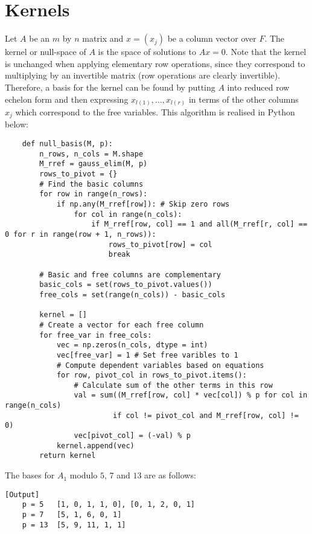 \documentclass{article}
\begin{document}
\section{Kernels}

Let \(A\) be an \(m\) by \(n\) matrix and \(x = (x_j)\) be a column vector over \(F\). The kernel or null-space of \(A\) is the space of solutions to \(Ax = 0\). Note that the kernel is unchanged when applying elementary row operations, since they correspond to multiplying by an invertible matrix (row operations are clearly invertible). Therefore, a basis for the kernel can be found by putting \(A\) into reduced row echelon form and then expressing \(x_{l(1)}, \dots, x_{l(r)}\) in terms of the other columns \(x_j\) which correspond to the free variables. This algorithm is realised in Python below:

\begin{verbatim}
    def null_basis(M, p):
        n_rows, n_cols = M.shape
        M_rref = gauss_elim(M, p)
        rows_to_pivot = {}
        # Find the basic columns
        for row in range(n_rows):
            if np.any(M_rref[row]): # Skip zero rows
                for col in range(n_cols):
                    if M_rref[row, col] == 1 and all(M_rref[r, col] == 0 for r in range(row + 1, n_rows)):
                        rows_to_pivot[row] = col
                        break
                    
        # Basic and free columns are complementary
        basic_cols = set(rows_to_pivot.values())
        free_cols = set(range(n_cols)) - basic_cols
        
        kernel = []
        # Create a vector for each free column
        for free_var in free_cols:
            vec = np.zeros(n_cols, dtype = int)
            vec[free_var] = 1 # Set free varibles to 1
            # Compute dependent variables based on equations
            for row, pivot_col in rows_to_pivot.items():
                # Calculate sum of the other terms in this row
                val = sum((M_rref[row, col] * vec[col]) % p for col in range(n_cols) 
                         if col != pivot_col and M_rref[row, col] != 0)
                vec[pivot_col] = (-val) % p
            kernel.append(vec)
        return kernel
\end{verbatim}

The bases for \(A_1\) modulo \(5\), \(7\) and \(13\) are as follows:
\begin{verbatim}[Output]
    p = 5   [1, 0, 1, 1, 0], [0, 1, 2, 0, 1]
    p = 7   [5, 1, 6, 0, 1]
    p = 13  [5, 9, 11, 1, 1]
\end{verbatim}  
\end{document}
